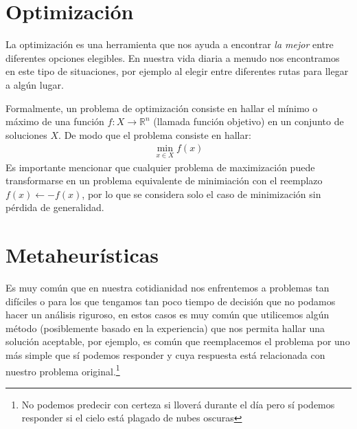 \section{Optimización}
La optimización es una herramienta que nos ayuda a encontrar \textit{la mejor} entre diferentes opciones elegibles. En nuestra vida diaria a menudo nos encontramos en este tipo de situaciones, por ejemplo al elegir entre diferentes rutas para llegar a algún lugar.

Formalmente, un problema de optimización consiste en hallar el mínimo o máximo de una función $f:X\rightarrow \mathbb{R}^n$ (llamada función objetivo) en un conjunto de soluciones $X$. De modo que el problema consiste en hallar:
\begin{gather}
\min_{x\in X} f(x)
\end{gather}
Es importante mencionar que cualquier problema de maximización puede transformarse en un problema equivalente de minimiación con el reemplazo $f(x) \leftarrow -f(x)$, por lo que se considera solo el caso de minimización sin pérdida de generalidad.
 

\section{Metaheurísticas}
Es muy común que en nuestra cotidianidad nos enfrentemos a problemas tan difíciles o para los que tengamos tan poco tiempo de decisión que no podamos hacer un análisis riguroso, en estos casos es muy común que utilicemos algún método (posiblemente basado en la experiencia) que nos permita hallar una solución aceptable, por ejemplo, es común que reemplacemos el problema por uno más simple que sí podemos responder y cuya respuesta está relacionada con nuestro problema original.\footnote{No podemos predecir con certeza si lloverá durante el día pero sí podemos responder si el cielo está plagado de nubes oscuras}  

